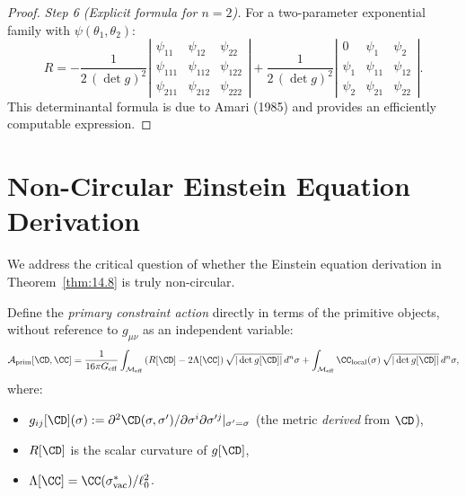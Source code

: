 \begin{proof}
\emph{Step 6 (Explicit formula for $n = 2$).}
For a two-parameter exponential family with
$\psi(\theta_1, \theta_2)$:
\begin{equation}\label{eq:ricci-2d}
  R = -\frac{1}{2\,(\det g)^2}\left|
    \begin{array}{ccc}
      \psi_{11} & \psi_{12} & \psi_{22} \\
      \psi_{111} & \psi_{112} & \psi_{122} \\
      \psi_{211} & \psi_{212} & \psi_{222}
    \end{array}
  \right|
  + \frac{1}{2\,(\det g)^2}\left|
    \begin{array}{ccc}
      0 & \psi_{1} & \psi_{2} \\
      \psi_{1} & \psi_{11} & \psi_{12} \\
      \psi_{2} & \psi_{21} & \psi_{22}
    \end{array}
  \right|.
\end{equation}
This determinantal formula is due to Amari (1985) and provides an
efficiently computable expression.
\end{proof}

\section{Non-Circular Einstein Equation Derivation}
\label{sec:ch15:einstein}

We address the critical question of whether the Einstein equation
derivation in Theorem~\ref{thm:14.8} is truly non-circular.

\begin{definition}\label{def:15.5}
Define the \emph{primary constraint action} directly in terms of
the primitive objects, without reference to $g_{\mu\nu}$ as an
independent variable:
\begin{equation}\label{eq:primary-action}
  \mathcal{A}_{\mathrm{prim}}[\CD, \CC]
  = \frac{1}{16\pi G_{\mathrm{eff}}}
  \int_{\CM_{\mathrm{eff}}}
  \left(R[\CD] - 2\Lambda[\CC]\right)
  \sqrt{|\det g[\CD]|}\,d^n\sigma
  + \int_{\CM_{\mathrm{eff}}} \CC_{\mathrm{local}}(\sigma)\,
  \sqrt{|\det g[\CD]|}\,d^n\sigma,
\end{equation}
where:
\begin{itemize}
  \item $g_{ij}[\CD](\sigma) :=
        \partial^2\CD(\sigma, \sigma')/\partial\sigma^i\partial
        \sigma'^j |_{\sigma'=\sigma}$ (the metric \emph{derived}
        from $\CD$),
  \item $R[\CD]$ is the scalar curvature of $g[\CD]$,
  \item $\Lambda[\CC] = \CC(\sigma^*_{\mathrm{vac}}) / \ell_0^2$.
\end{itemize}
\end{definition}

